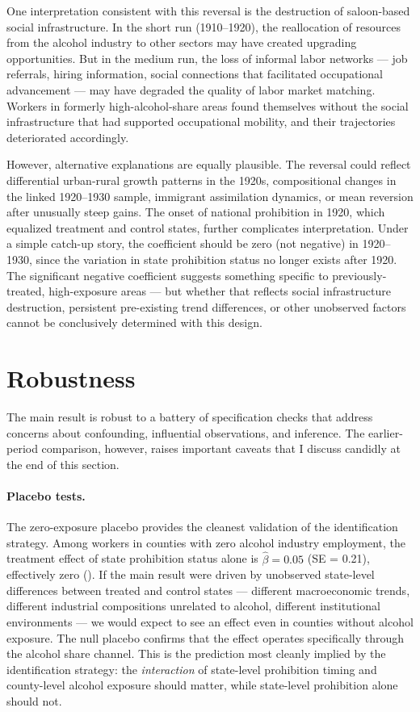\documentclass[12pt]{article}
\begin{document}
One interpretation consistent with this reversal is the destruction of saloon-based social infrastructure. In the short run (1910--1920), the reallocation of resources from the alcohol industry to other sectors may have created upgrading opportunities. But in the medium run, the loss of informal labor networks --- job referrals, hiring information, social connections that facilitated occupational advancement --- may have degraded the quality of labor market matching. Workers in formerly high-alcohol-share areas found themselves without the social infrastructure that had supported occupational mobility, and their trajectories deteriorated accordingly.

However, alternative explanations are equally plausible. The reversal could reflect differential urban-rural growth patterns in the 1920s, compositional changes in the linked 1920--1930 sample, immigrant assimilation dynamics, or mean reversion after unusually steep gains. The onset of national prohibition in 1920, which equalized treatment and control states, further complicates interpretation. Under a simple catch-up story, the coefficient should be zero (not negative) in 1920--1930, since the variation in state prohibition status no longer exists after 1920. The significant negative coefficient suggests something specific to previously-treated, high-exposure areas --- but whether that reflects social infrastructure destruction, persistent pre-existing trend differences, or other unobserved factors cannot be conclusively determined with this design.


\section{Robustness}
\label{sec:robust}

The main result is robust to a battery of specification checks that address concerns about confounding, influential observations, and inference. The earlier-period comparison, however, raises important caveats that I discuss candidly at the end of this section.

\paragraph{Placebo tests.} The zero-exposure placebo provides the cleanest validation of the identification strategy. Among workers in counties with zero alcohol industry employment, the treatment effect of state prohibition status alone is $\hat{\beta} = 0.05$ (SE = 0.21), effectively zero (). If the main result were driven by unobserved state-level differences between treated and control states --- different macroeconomic trends, different industrial compositions unrelated to alcohol, different institutional environments --- we would expect to see an effect even in counties without alcohol exposure. The null placebo confirms that the effect operates specifically through the alcohol share channel. This is the prediction most cleanly implied by the identification strategy: the \emph{interaction} of state-level prohibition timing and county-level alcohol exposure should matter, while state-level prohibition alone should not.
\end{document}
